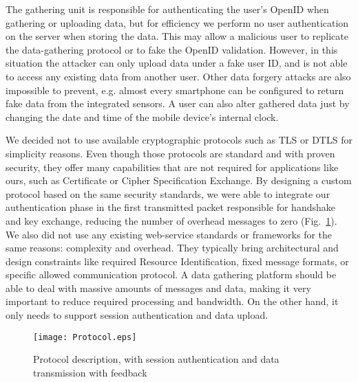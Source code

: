 The gathering unit is responsible for authenticating the user's OpenID when gathering or uploading data, but for efficiency we perform no user authentication on the server when storing the data.
This may allow a malicious user to replicate the data-gathering protocol or to fake the OpenID validation.
However, in this situation the attacker can only upload data under a fake user ID, and is not able to access any existing data from another user.
Other data forgery attacks are also impossible to prevent, e.g. almost every smartphone can be configured to return fake data from the integrated sensors.
A user can also alter gathered data just by changing the date and time of the mobile device's internal clock.





















We decided not to use available cryptographic protocols such as TLS or DTLS for simplicity reasons.
Even though those protocols are standard and with proven security, they offer many capabilities that are not required for applications like ours, such as Certificate or Cipher Specification Exchange.
By designing a custom protocol based on the same security standards, we were able to integrate our authentication phase in the first transmitted packet responsible for handshake and key exchange, reducing the number of overhead messages to zero (Fig.~\ref{figure:protocol}).
We also did not use any existing web-service standards or frameworks for the same reasons: complexity and overhead.
They typically bring architectural and design constraints like required Resource Identification, fixed message formats, or specific allowed communication protocol.
A data gathering platform should be able to deal with massive amounts of messages and data, making it very important to reduce required processing and bandwidth.
On the other hand, it only needs to support session authentication and data upload.

\begin{figure}[tb]
 \centering
 \texttt{[image: Protocol.eps]}
 \caption{Protocol description, with session authentication and data transmission with feedback}
 \label{figure:protocol}
\end{figure}



